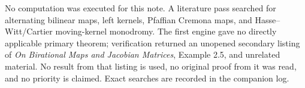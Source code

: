 No computation was executed for this note. A literature pass searched
for alternating bilinear maps, left kernels, Pfaffian Cremona maps,
and Hasse--Witt/Cartier moving-kernel monodromy. The first engine gave
no directly applicable primary theorem; verification returned an
unopened secondary listing of \emph{On Birational Maps and Jacobian
Matrices}, Example 2.5, and unrelated material. No result from that
listing is used, no original proof from it was read, and no priority
is claimed. Exact searches are recorded in the companion log.
